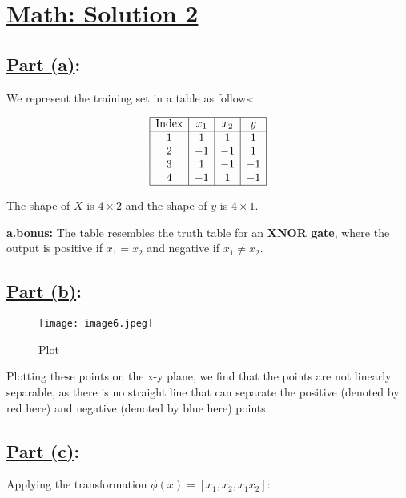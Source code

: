 \documentclass[12pt]{article}
\begin{document}
\section*{\underline{Math: Solution 2}}

\subsection*{\underline{Part (a)}:}
We represent the training set in a table as follows:

\[
  \begin{array}{|c|c|c|c|}
    \hline
    \text{Index} & x_1 & x_2 & y  \\
    \hline
    1            & 1   & 1   & 1  \\
    2            & -1  & -1  & 1  \\
    3            & 1   & -1  & -1 \\
    4            & -1  & 1   & -1 \\
    \hline
  \end{array}
\]

The shape of \( X \) is \( 4 \times 2 \) and the shape of \( y \) is \( 4 \times 1 \).

\textbf{a.bonus:} The table resembles the truth table for an \textbf{XNOR gate}, where the output is positive if \( x_1 = x_2 \) and negative if \( x_1 \neq x_2 \).

\subsection*{\underline{Part (b)}:}
\begin{figure}[h!] %
  \centering %
  \texttt{[image: image6.jpeg]} %
  \caption{Plot} %
  \label{fig:your_label} %
\end{figure}
Plotting these points on the x-y plane, we find that the points are not linearly separable, as there is no straight line that can separate the positive (denoted by red here) and negative (denoted by blue here) points.


\subsection*{\underline{Part (c)}:}
Applying the transformation \( \phi(x) = [x_1, x_2, x_1 x_2] \):
\end{document}
